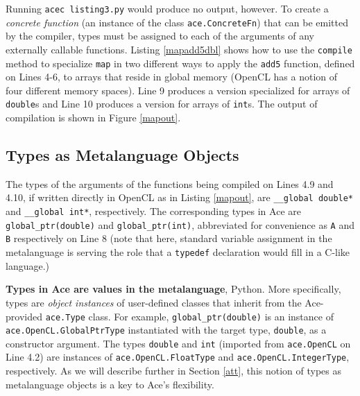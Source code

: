 \documentclass{sig-alternate}
\begin{document}
Running \verb|acec listing3.py| would produce no output, however. To create a {\em concrete function} (an instance of the class \verb|ace.ConcreteFn|) that can be emitted by the compiler, types must be assigned to each of the arguments of any externally callable functions. Listing \ref{mapadd5dbl} shows how to use the \verb|compile| method to specialize \verb|map| in two different ways to apply the \verb|add5| function, defined on Lines 4-6, to arrays  that reside in global memory (OpenCL has a notion of four different memory spaces). Line 9 produces a version specialized for arrays of \verb|double|s and Line 10 produces a version for arrays of \verb|int|s. The output of compilation is shown in Figure \ref{mapout}.

\subsection{Types as Metalanguage Objects}
The types of the arguments of the functions being compiled on Lines 4.9 and 4.10, if written directly in OpenCL as in Listing \ref{mapout}, are \verb|__global double*| and \verb|__global int*|, respectively. The corresponding types in Ace are \verb|global_ptr(double)| and \verb|global_ptr(int)|, abbreviated for convenience as \verb|A| and \verb|B| respectively on Line 8 (note that here, standard variable assignment in the metalanguage is serving the role that a \verb|typedef| declaration would fill in a C-like language.)

\textbf{Types in Ace are values in the metalanguage}, Python. More specifically, types are {\em object instances} of user-defined classes that inherit from the Ace-provided \verb|ace.Type| class. For example, \verb|global_ptr(double)| is an instance of \verb|ace.OpenCL.GlobalPtrType| instantiated with the target type, \verb|double|, as a constructor argument. The types \verb|double| and \verb|int| (imported from \verb|ace.OpenCL| on Line 4.2) are instances of \verb|ace.OpenCL.FloatType| and \verb|ace.OpenCL.IntegerType|, respectively. As we will describe further in Section \ref{att}, this notion of types as metalanguage objects is a key to Ace's flexibility.
\end{document}
